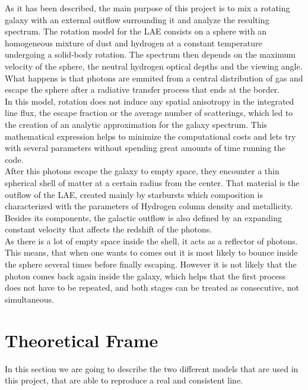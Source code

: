 \documentclass{emulateapj}
\begin{document}
As it has been described, the main purpose of this project is to mix a rotating galaxy with an external outflow surrounding it and analyze the resulting spectrum. The rotation model for the LAE consists on a sphere with an homogeneous mixture of dust and hydrogen at a constant temperature undergoing a solid-body rotation. The spectrum then depends on the maximum velocity of the sphere, the neutral hydrogen optical depths and the viewing angle. What happens is that photons are emmited from a central distribution of gas and escape the sphere after a radiative transfer process that ends at the border.\\

In this model, rotation does not induce any spatial anisotropy in the integrated line flux, the escape fraction or the average number of scatterings, which led to the creation of an analytic approximation for the galaxy spectrum. This mathematical expression helps to minimize the computational costs and lets try with several parameters without spending great amounts of time running the code. \\

After this photons escape the galaxy to empty space, they encounter a thin spherical shell of matter at a certain radius from the center. That material is the outflow of the LAE, created mainly by starbursts which composition is characterized with the parameters of Hydrogen column density and metallicity. Besides its components, the galactic outflow is also defined by an expanding constant velocity that affects the redshift of the photons.\\

As there is a lot of empty space inside the shell, it acts as a reflector of photons. This means, that when one wants to comes out it is most likely to bounce inside the sphere several times before finally escaping. However it is not likely that the photon comes back again inside the galaxy, which helps that the first process does not have to be repeated, and both stages can be treated as consecutive, not simultaneous. \\


\section{Theoretical Frame}
\label{sec:theo}
In this section we are going to describe the two different models that are used in this project, that are able to reproduce a real and consistent line.\\
\end{document}
